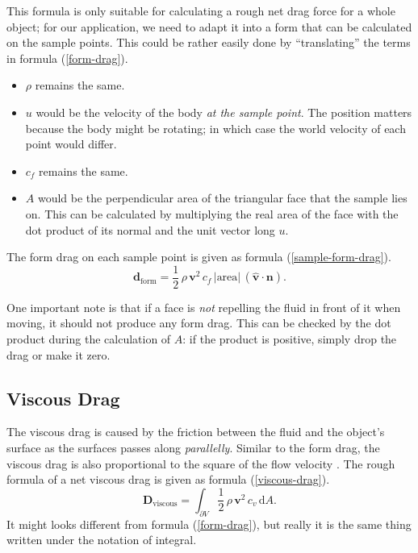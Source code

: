 This formula is only suitable for calculating a rough net drag force for a whole object;
for our application, we need to adapt it into a form that can be calculated on the sample points.
This could be rather easily done by ``translating'' the terms in formula (\ref{form-drag}).
\begin{itemize}
	\item $\rho$ remains the same.
	\item $u$ would be the velocity of the body \emph{at the sample point}.
		The position matters because the body might be rotating; in which case the world velocity of each point would differ.
	\item $c_f$ remains the same.
	\item $A$ would be the perpendicular area of the triangular face that the sample lies on.
		This can be calculated by multiplying the real area of the face with the dot product of its normal and the unit vector long $u$.
\end{itemize}

The form drag on each sample point is given as formula (\ref{sample-form-drag}).
\begin{equation}
	\mathbf{d}_{\text{form}}=\frac{1}{2}\,\rho\,\mathbf{v}^2\,c_f\,|\text{area}|\,(\hat{\mathbf{v}}\cdot\mathbf{n}).
	\label{sample-form-drag}
\end{equation}

One important note is that if a face is \emph{not} repelling the fluid in front of it when moving, it should not produce any form drag.
This can be checked by the dot product during the calculation of $A$: if the product is positive, simply drop the drag or make it zero.

\subsection{Viscous Drag}

The viscous drag is caused by the friction between the fluid and the object's surface as the surfaces passes along \emph{parallelly}.
Similar to the form drag, the viscous drag is also proportional to the square of the flow velocity \cite{trouton1906coefficient}.
The rough formula of a net viscous drag is given as formula (\ref{viscous-drag}).
\begin{equation}
	\mathbf{D}_{\text{viscous}}=\int_{\partial V}\frac{1}{2}\,\rho\,\mathbf{v}^2\,c_v\,\text{d}A.
	\label{viscous-drag}
\end{equation}
It might looks different from formula (\ref{form-drag}), but really it is the same thing written under the notation of integral.

